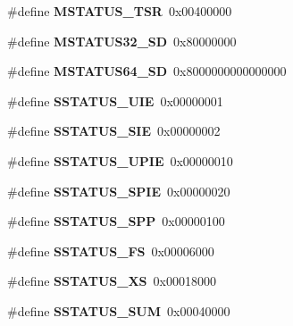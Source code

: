 \begin{DoxyCompactItemize}
\#define {\bfseries M\+S\+T\+A\+T\+U\+S\+\_\+\+T\+SR}~0x00400000
\item 
\mbox{\label{riscv-utility_8h_acca6e5c4f8af666a9b299af295f43348}} 
\#define {\bfseries M\+S\+T\+A\+T\+U\+S32\+\_\+\+SD}~0x80000000
\item 
\mbox{\label{riscv-utility_8h_a9d7df82e40e8cf00821e97a0bb8db04e}} 
\#define {\bfseries M\+S\+T\+A\+T\+U\+S64\+\_\+\+SD}~0x8000000000000000
\item 
\mbox{\label{riscv-utility_8h_a431c67f7f0e4b5dbdf2048310ad814e0}} 
\#define {\bfseries S\+S\+T\+A\+T\+U\+S\+\_\+\+U\+IE}~0x00000001
\item 
\mbox{\label{riscv-utility_8h_a1c1f1da0ecfca5bc4fc4db3acadf1bc8}} 
\#define {\bfseries S\+S\+T\+A\+T\+U\+S\+\_\+\+S\+IE}~0x00000002
\item 
\mbox{\label{riscv-utility_8h_a796ad1a8b2314776082e72e13f4a30cf}} 
\#define {\bfseries S\+S\+T\+A\+T\+U\+S\+\_\+\+U\+P\+IE}~0x00000010
\item 
\mbox{\label{riscv-utility_8h_a3f9373ba6db2ce5e5c7ea28c2a5b3df9}} 
\#define {\bfseries S\+S\+T\+A\+T\+U\+S\+\_\+\+S\+P\+IE}~0x00000020
\item 
\mbox{\label{riscv-utility_8h_a4d0820d6a8b0c5b0fef6875a985d3370}} 
\#define {\bfseries S\+S\+T\+A\+T\+U\+S\+\_\+\+S\+PP}~0x00000100
\item 
\mbox{\label{riscv-utility_8h_aff201911cccf15e446c43ba67b0f1aa7}} 
\#define {\bfseries S\+S\+T\+A\+T\+U\+S\+\_\+\+FS}~0x00006000
\item 
\mbox{\label{riscv-utility_8h_a2abef254823774927e3bf6b029fbad9d}} 
\#define {\bfseries S\+S\+T\+A\+T\+U\+S\+\_\+\+XS}~0x00018000
\item 
\mbox{\label{riscv-utility_8h_ac8726a0a74700feb038f6b74dbb3dc0f}} 
\#define {\bfseries S\+S\+T\+A\+T\+U\+S\+\_\+\+S\+UM}~0x00040000
\item 
\mbox{\label{riscv-utility_8h_a3387d409543279220628618c0909fe55}} 

\end{DoxyCompactItemize}
